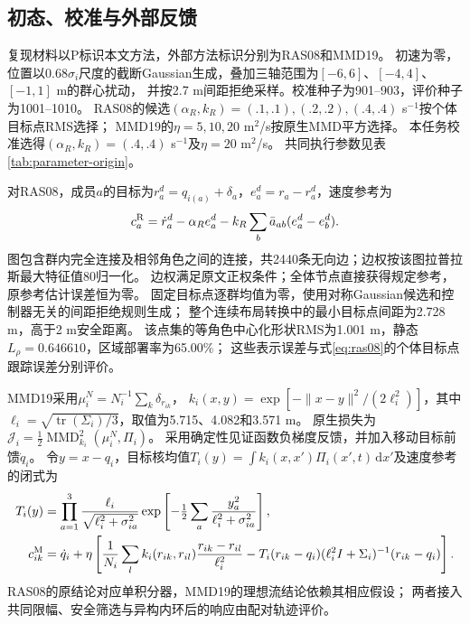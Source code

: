 \documentclass[UTF8,a4paper,11pt,fontset=none]{ctexart}
\begin{document}
\subsection{初态、校准与外部反馈}
复现材料以P标识本文方法，外部方法标识分别为RAS08和MMD19。
初速为零，位置以$0.68\sigma_i$尺度的截断Gaussian生成，叠加三轴范围为$[-6,6]$、$[-4,4]$、$[-1,1]$ m的群心扰动，
并按2.7 m间距拒绝采样。校准种子为901--903，评价种子为1001--1010。
RAS08的候选$(\alpha_R,k_R)=(.1,.1),(.2,.2),(.4,.4)$ s$^{-1}$按个体目标点RMS选择；
MMD19的$\eta=5,10,20$ m$^2$/s按原生MMD平方选择。
本任务校准选得$(\alpha_R,k_R)=(.4,.4)$ s$^{-1}$及$\eta=20$ m$^2$/s。
共同执行参数见表\ref{tab:parameter-origin}。

对RAS08，成员$a$的目标为$r_a^d=q_{i(a)}+\delta_a$，$e_a^d=r_a-r_a^d$，速度参考为
\begin{equation}
c_a^{\rm R}=\dot r_a^d-\alpha_R e_a^d
-k_R\sum_b\bar a_{ab}(e_a^d-e_b^d).
\label{eq:ras08}
\end{equation}
图包含群内完全连接及相邻角色之间的连接，共2440条无向边；边权按该图拉普拉斯最大特征值80归一化。
边权满足原文正权条件；全体节点直接获得规定参考，原参考估计误差恒为零。
固定目标点逐群均值为零，使用对称Gaussian候选和控制器无关的间距拒绝规则生成；
整个连续布局转换中的最小目标点间距为2.728 m，高于2 m安全距离。
该点集的等角色中心化形状RMS为1.001 m，静态$L_\rho=0.646610$，区域部署率为65.00\%；
这些表示误差与式\eqref{eq:ras08}的个体目标点跟踪误差分别评价。

MMD19采用$\mu_i^N=N_i^{-1}\sum_k\delta_{r_{ik}}$，
$k_i(x,y)=\exp[-\|x-y\|^2/(2\ell_i^2)]$，其中
$\ell_i=\sqrt{\operatorname{tr}(\Sigma_i)/3}$，取值为5.715、4.082和3.571 m。
原生损失为$\mathcal J_i=\frac12\operatorname{MMD}_{k_i}^2(\mu_i^N,\Pi_i)$。
采用确定性见证函数负梯度反馈，并加入移动目标前馈$\dot q_i$。
令$y=x-q_i$，目标核均值$T_i(y)=\int k_i(x,x')\Pi_i(x',t)\,\mathrm dx'$及速度参考的闭式为
\begin{equation}
\begin{aligned}
T_i(y)&=\prod_{a=1}^3\frac{\ell_i}{\sqrt{\ell_i^2+\sigma_{ia}^2}}
\exp\left[-\tfrac12\sum_a\frac{y_a^2}{\ell_i^2+\sigma_{ia}^2}\right],\\
c_{ik}^{\rm M}&=\dot q_i+\eta\left[\frac1{N_i}\sum_l k_i(r_{ik},r_{il})\frac{r_{ik}-r_{il}}{\ell_i^2}
-T_i(r_{ik}-q_i)(\ell_i^2I+\Sigma_i)^{-1}(r_{ik}-q_i)\right].
\end{aligned}\label{eq:mmd19}
\end{equation}
RAS08的原结论对应单积分器，MMD19的理想流结论依赖其相应假设；
两者接入共同限幅、安全筛选与异构内环后的响应由配对轨迹评价。
\end{document}
